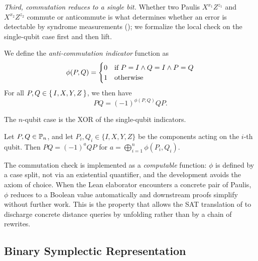 \emph{Third, commutation reduces to a single bit.} Whether two Paulis
$X^{x_1}Z^{z_1}$ and $X^{x_2}Z^{z_2}$ commute or anticommute is what determines
whether an error is detectable by syndrome measurements
(); we formalize the local check on the single-qubit case
first and then lift.
\begin{lemma}
    We define the \emph{anti-commutation indicator} function as
    \begin{equation}
        \label{eq:pauli-pauli-phase}
        \phi(P, Q)=\begin{cases}
            0 & \textnormal{if } P=I\wedge Q=I\wedge P=Q \\
            1 & \textnormal{otherwise}
        \end{cases}
    \end{equation}
    For all $P, Q\in\set{I, X, Y, Z}$, we then have
    $$PQ=(-1)^{\phi(P, Q)} QP.$$
\end{lemma}
%

The $n$-qubit case is the XOR of the single-qubit indicators.
\begin{lemma}
    Let $P, Q \in \mathbb{P}_n$, and let $P_i, Q_i \in \{I, X, Y, Z\}$ be the
    components acting on the $i$-th qubit. Then $PQ = (-1)^a QP$ for $a =
    \bigoplus_{i=1}^n \phi(P_i, Q_i)$.
\end{lemma}

%

The commutation check is implemented as a \emph{computable} function: $\phi$ is
defined by a case split, not via an existential quantifier, and the development
avoids the axiom of choice. When the Lean elaborator encounters a concrete pair
of Paulis, $\phi$ reduces to a Boolean value automatically and downstream proofs
simplify without further work. This is the property that allows the SAT
translation of  to discharge concrete distance queries by
unfolding rather than by a chain of rewrites.

\subsection{Binary Symplectic Representation}
\label{sec:binsymp}

